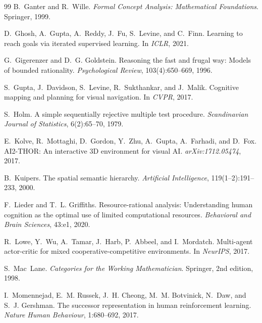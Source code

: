 \documentclass{article}
\begin{document}
\begin{thebibliography}{99}
B.~Ganter and R.~Wille.
\newblock \emph{Formal Concept Analysis: Mathematical Foundations}.
\newblock Springer, 1999.

D.~Ghosh, A.~Gupta, A.~Reddy, J.~Fu, S.~Levine, and C.~Finn.
\newblock Learning to reach goals via iterated supervised learning.
\newblock In \emph{ICLR}, 2021.

G.~Gigerenzer and D.~G. Goldstein.
\newblock Reasoning the fast and frugal way: Models of bounded rationality.
\newblock \emph{Psychological Review}, 103(4):650--669, 1996.

S.~Gupta, J.~Davidson, S.~Levine, R.~Sukthankar, and J.~Malik.
\newblock Cognitive mapping and planning for visual navigation.
\newblock In \emph{CVPR}, 2017.

S.~Holm.
\newblock A simple sequentially rejective multiple test procedure.
\newblock \emph{Scandinavian Journal of Statistics}, 6(2):65--70, 1979.

E.~Kolve, R.~Mottaghi, D.~Gordon, Y.~Zhu, A.~Gupta, A.~Farhadi, and D.~Fox.
\newblock AI2-THOR: An interactive 3D environment for visual AI.
\newblock \emph{arXiv:1712.05474}, 2017.

B.~Kuipers.
\newblock The spatial semantic hierarchy.
\newblock \emph{Artificial Intelligence}, 119(1--2):191--233, 2000.

F.~Lieder and T.~L. Griffiths.
\newblock Resource-rational analysis: Understanding human cognition as the optimal use of limited computational resources.
\newblock \emph{Behavioral and Brain Sciences}, 43:e1, 2020.

R.~Lowe, Y.~Wu, A.~Tamar, J.~Harb, P.~Abbeel, and I.~Mordatch.
\newblock Multi-agent actor-critic for mixed cooperative-competitive environments.
\newblock In \emph{NeurIPS}, 2017.

S.~Mac~Lane.
\newblock \emph{Categories for the Working Mathematician}.
\newblock Springer, 2nd edition, 1998.

I.~Momennejad, E.~M. Russek, J.~H. Cheong, M.~M. Botvinick, N.~Daw, and S.~J. Gershman.
\newblock The successor representation in human reinforcement learning.
\newblock \emph{Nature Human Behaviour}, 1:680--692, 2017.


\end{thebibliography}
\end{document}
